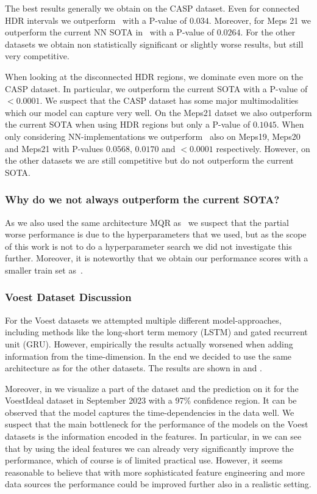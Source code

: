 The best results generally we obtain on the CASP dataset. Even for connected HDR intervals we outperform~\cite{sesia2021conformal} with a P-value of $0.034$. Moreover, for Meps 21 we outperform the current NN SOTA in~\cite{sesia2021conformal} with a P-value of $0.0264$. For the other datasets we obtain non statistically significant or slightly worse results, but still very competitive.

When looking at the disconnected HDR regions, we dominate even more on the CASP dataset. In particular, we outperform the current SOTA with a P-value of $<0.0001$. We suspect that the CASP dataset has some major multimodalities which our model can capture very well. On the Meps21 datset we also outperform the current SOTA when using HDR regions but only a P-value of $0.1045$. When only considering NN-implementations we outperform~\cite{sesia2021conformal} also on Meps19, Meps20 and Meps21 with P-values $0.0568$, $0.0170$ and $<0.0001$ respectively. However, on the other datasets we are still competitive but do not outperform the current SOTA.\@

\subsubsection{Why do we not always outperform the current SOTA?}

As we also used the same architecture MQR as~\cite{sesia2021conformal} we suspect that the partial worse performance is due to the hyperparameters that we used, but as the scope of this work is not to do a hyperparameter search we did not investigate this further. Moreover, it is noteworthy that we obtain our performance scores with a smaller train set as~\cite{sesia2021conformal}.

\subsubsection{Voest Dataset Discussion}

For the Voest datasets we attempted multiple different model-approaches, including methods like the long-short term memory (LSTM) and gated recurrent unit (GRU). However, empirically the results actually worsened when adding information from the time-dimension. In the end we decided to use the same architecture as for the other datasets. The results are shown in  and .

Moreover, in  we visualize a part of the dataset and the prediction on it for the VoestIdeal dataset in September 2023 with a 97\% confidence region. It can be observed that the model captures the time-dependencies in the data well. We suspect that the main bottleneck for the performance of the models on the Voest datasets is the information encoded in the features. In particular, in  we can see that by using the ideal features we can already very significantly improve the performance, which of course is of limited practical use. However, it seems reasonable to believe that with more sophisticated feature engineering and more data sources the performance could be improved further also in a realistic setting.

